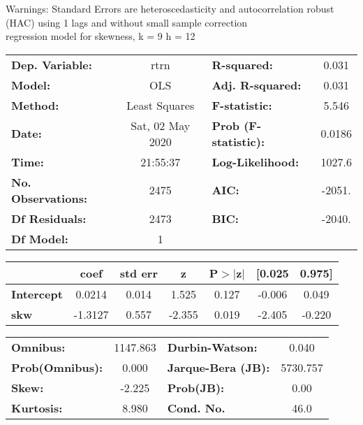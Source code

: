 Warnings: \newline
 [1] Standard Errors are heteroscedasticity and autocorrelation robust (HAC) using 1 lags and without small sample correction\\ 

regression model for skewness, k = 9 h = 12\begin{center}
\begin{tabular}{lclc}
\toprule
\textbf{Dep. Variable:}    &       rtrn       & \textbf{  R-squared:         } &     0.031   \\
\textbf{Model:}            &       OLS        & \textbf{  Adj. R-squared:    } &     0.031   \\
\textbf{Method:}           &  Least Squares   & \textbf{  F-statistic:       } &     5.546   \\
\textbf{Date:}             & Sat, 02 May 2020 & \textbf{  Prob (F-statistic):} &   0.0186    \\
\textbf{Time:}             &     21:55:37     & \textbf{  Log-Likelihood:    } &    1027.6   \\
\textbf{No. Observations:} &        2475      & \textbf{  AIC:               } &    -2051.   \\
\textbf{Df Residuals:}     &        2473      & \textbf{  BIC:               } &    -2040.   \\
\textbf{Df Model:}         &           1      & \textbf{                     } &             \\
\bottomrule
\end{tabular}
\begin{tabular}{lcccccc}
                   & \textbf{coef} & \textbf{std err} & \textbf{z} & \textbf{P$> |$z$|$} & \textbf{[0.025} & \textbf{0.975]}  \\
\midrule
\textbf{Intercept} &       0.0214  &        0.014     &     1.525  &         0.127        &       -0.006    &        0.049     \\
\textbf{skw}       &      -1.3127  &        0.557     &    -2.355  &         0.019        &       -2.405    &       -0.220     \\
\bottomrule
\end{tabular}
\begin{tabular}{lclc}
\textbf{Omnibus:}       & 1147.863 & \textbf{  Durbin-Watson:     } &    0.040  \\
\textbf{Prob(Omnibus):} &   0.000  & \textbf{  Jarque-Bera (JB):  } & 5730.757  \\
\textbf{Skew:}          &  -2.225  & \textbf{  Prob(JB):          } &     0.00  \\
\textbf{Kurtosis:}      &   8.980  & \textbf{  Cond. No.          } &     46.0  \\
\bottomrule
\end{tabular}
\end{center}

